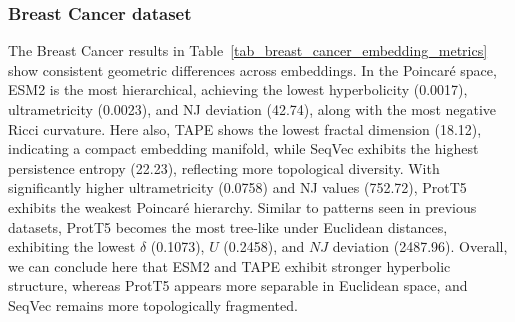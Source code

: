 \documentclass[]{Liebert_Author_revised}
\begin{document}

\subsubsection{Breast Cancer dataset}
The Breast Cancer results in Table~\ref{tab_breast_cancer_embedding_metrics} show consistent geometric differences across embeddings. In the Poincaré space, ESM2 is the most hierarchical, achieving the lowest hyperbolicity (0.0017), ultrametricity (0.0023), and NJ deviation (42.74), along with the most negative Ricci curvature. Here also, TAPE shows the lowest fractal dimension (18.12), indicating a compact embedding manifold, while SeqVec exhibits the highest persistence entropy (22.23), reflecting more topological diversity. 
With significantly higher ultrametricity (0.0758) and NJ values (752.72), ProtT5 exhibits the weakest Poincaré hierarchy. Similar to patterns seen in previous datasets, ProtT5 becomes the most tree-like under Euclidean distances, exhibiting the lowest $\delta$ (0.1073), $U$ (0.2458), and $NJ$ deviation (2487.96). Overall, we can conclude here that ESM2 and TAPE exhibit stronger hyperbolic structure, whereas ProtT5 appears more separable in Euclidean space, and SeqVec remains more topologically fragmented.


\end{document}
